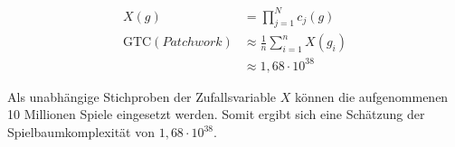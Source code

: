 \begin{equation}
    \label{eqn:gtc-patchwork-avg-estimation}
    \begin{aligned}
        X(g)                  & = \prod\nolimits_{j=1}^{N} c_j(g)         \\[15pt]
        \text{GTC}(Patchwork) & \approx \frac{1}{n} \sum_{i=1}^{n} X(g_i) \\[1pt]
                              & \approx 1{,}68 \cdot 10^{38}
    \end{aligned}
\end{equation}

Als unabhängige Stichproben der Zufallsvariable $X$ können die aufgenommenen 10 Millionen Spiele eingesetzt werden. Somit ergibt sich eine Schätzung der Spielbaumkomplexität von $1{,}68 \cdot 10^{38}$.
